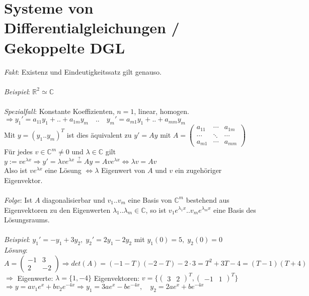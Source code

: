 \documentclass[12pt,a4paper,titlepage]{article}
\newcommand{\setC}{\mathbb{C}}
\newcommand{\setR}{\mathbb{R}}
\begin{document}
\section*{Systeme von Differentialgleichungen / Gekoppelte DGL}
\textit{Fakt}: Existenz und Eindeutigkeitssatz gilt genauso. \\
\\
\textit{Beispiel}: $\setR^2\simeq\setC$ \\
\\
\textit{Spezialfall}: Konstante Koeffizienten, $n=1$, linear, homogen. \\
$\Rightarrow y_1'=a_{11}y_1+..+a_{1m}y_m \quad..\quad y_m'=a_{m1}y_1+..+a_{mm}y_m$ \\
Mit $y=(y_1..y_m)^T$ ist dies äquivalent zu $y'=Ay$ mit $A=\begin{pmatrix}a_{11} & \cdots & a_{1m} \\
  \cdots & \ddots  & \cdots \\
  a_{m1} & \cdots & a_{mm} \end{pmatrix}$ \\
Für jedes $v\in\setC^m\neq 0$ und $\lambda\in\setC$ gilt $y:=ve^{\lambda x} \Rightarrow y'=\lambda ve^{\lambda x}\overset{?}{=} Ay=Ave^{\lambda x} \iff \lambda v=Av$ \\
Also ist $ve^{\lambda x}$ eine Lösung $\iff \lambda$ Eigenwert von $A$ und $v$ ein zugehöriger Eigenvektor. \\
\\
\textit{Folge}: Ist $A$ diagonalisierbar und $v_1..v_m$ eine Basis von $\setC^m$ bestehend aus Eigenvektoren zu den Eigenwerten $\lambda_1..\lambda_m\in\setC$, so ist $v_1e^{\lambda_1x}..v_me^{\lambda_mx}$ eine Basis des Lösungsraums. \\
\\
\textit{Beispiel}: $y_1'=-y_1+3y_2,\; y_2'=2y_1-2y_2$ mit $y_1(0)=5,\; y_2(0)=0$ \\
\textit{Lösung}: $A=\begin{pmatrix}-1&3 \\ 2&-2\end{pmatrix} \Rightarrow det(A)=(-1-T)(-2-T)-2\cdot 3 = T^2+3T-4=(T-1)(T+4)$ \\
$\Rightarrow $ Eigenwerte: $\lambda=\{1,-4\}$ Eigenvektoren: $v=\{\begin{pmatrix}3&2\end{pmatrix}^T, \begin{pmatrix}-1&1\end{pmatrix}^T\}$ \\
$\Rightarrow y=av_1e^x+bv_2e^{-4x} \Rightarrow y_1=3ae^x-be^{-4x},\quad y_2=2ae^x+be^{-4x}$ \\
\end{document}
